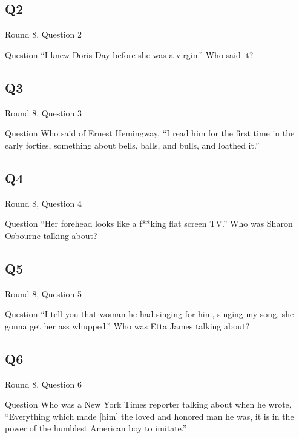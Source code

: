 \documentclass[11pt]{beamer}
\begin{document}
\subsection*{Q2}
\begin{frame}[t]{Round 8, Question 2}
\begin{block}{Question}
``I knew Doris Day before she was a virgin.'' Who said it?
\end{block}
\end{frame}
\subsection*{Q3}
\begin{frame}[t]{Round 8, Question 3}
\begin{block}{Question}
Who said of Ernest Hemingway, ``I read him for the first time in the early forties, something about bells, balls, and bulls, and loathed it.''
\end{block}
\end{frame}
\subsection*{Q4}
\begin{frame}[t]{Round 8, Question 4}
\begin{block}{Question}
``Her forehead looks like a f**king flat screen TV.'' Who was Sharon Osbourne talking about?
\end{block}
\end{frame}
\subsection*{Q5}
\begin{frame}[t]{Round 8, Question 5}
\begin{block}{Question}
``I tell you that woman he had singing for him, singing my song, she gonna get her ass whupped.'' Who was Etta James talking about?
\end{block}
\end{frame}
\subsection*{Q6}
\begin{frame}[t]{Round 8, Question 6}
\begin{block}{Question}
Who was a New York Times reporter talking about when he wrote, ``Everything which made [him] the loved and honored man he was, it is in the power of the humblest American boy to imitate.''
\end{block}
\end{frame}
\end{document}
